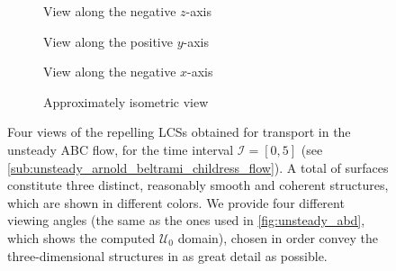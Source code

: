 \begin{figure}[htpb]
    \centering
    \hspace*{\fill}
    \begin{subfigure}[b]{0.42\textwidth}
        \centering
        \caption[]{{\small View along the negative $z$-axis}}
        \label{fig:unsteady_lcss_z}
    \end{subfigure}\hfill%
    \begin{subfigure}[b]{0.42\textwidth}
        \centering
        \caption[]{{\small View along the positive $y$-axis}}
        \label{fig:unsteady_lcss_y}
    \end{subfigure}%
    \hspace*{\fill}

    \hspace*{\fill}
    \begin{subfigure}[b]{0.42\textwidth}
        \centering
        \caption[]{{\small View along the negative $x$-axis}}
        \label{fig:unsteady_lcss_x}
    \end{subfigure}\hfill%
    \begin{subfigure}[b]{0.42\textwidth}
        \centering
        \caption[]{{\small Approximately isometric view}}
        \label{fig:unsteady_lcss_isometric}
    \end{subfigure}%
    \hspace*{\fill}
    \caption[Four views of the repelling LCSs obtained for transport in the
    unsteady ABC flow]
    {
        Four views of the repelling LCSs obtained for transport in the unsteady
        ABC flow, for the time interval $\mathcal{I}=[0,5]$ (see
        \cref{sub:unsteady_arnold_beltrami_childress_flow}). A total of
         surfaces constitute three distinct, reasonably smooth and
        coherent structures, which are shown in different colors. We provide
        four different viewing angles (the same as the ones used in
        \cref{fig:unsteady_abd}, which shows the computed $\mathcal{U}_{0}$
        domain), chosen in order convey the three-dimensional structures in as
        great detail as possible.
}
    \label{fig:unsteady_lcss}
\end{figure}

